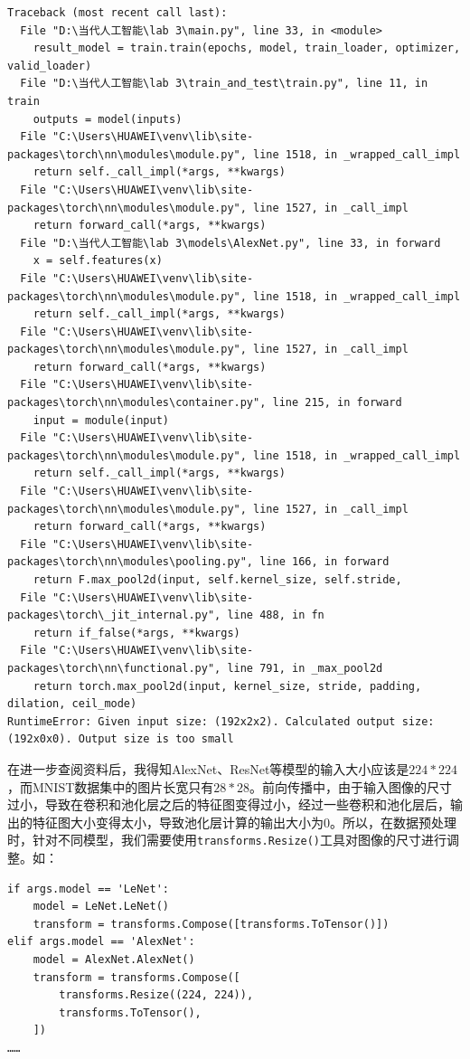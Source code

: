\documentclass{article}
\begin{document}
\begin{lstlisting}
Traceback (most recent call last):
  File "D:\当代人工智能\lab 3\main.py", line 33, in <module>
    result_model = train.train(epochs, model, train_loader, optimizer, valid_loader)
  File "D:\当代人工智能\lab 3\train_and_test\train.py", line 11, in train
    outputs = model(inputs)
  File "C:\Users\HUAWEI\venv\lib\site-packages\torch\nn\modules\module.py", line 1518, in _wrapped_call_impl
    return self._call_impl(*args, **kwargs)
  File "C:\Users\HUAWEI\venv\lib\site-packages\torch\nn\modules\module.py", line 1527, in _call_impl
    return forward_call(*args, **kwargs)
  File "D:\当代人工智能\lab 3\models\AlexNet.py", line 33, in forward
    x = self.features(x)
  File "C:\Users\HUAWEI\venv\lib\site-packages\torch\nn\modules\module.py", line 1518, in _wrapped_call_impl
    return self._call_impl(*args, **kwargs)
  File "C:\Users\HUAWEI\venv\lib\site-packages\torch\nn\modules\module.py", line 1527, in _call_impl
    return forward_call(*args, **kwargs)
  File "C:\Users\HUAWEI\venv\lib\site-packages\torch\nn\modules\container.py", line 215, in forward
    input = module(input)
  File "C:\Users\HUAWEI\venv\lib\site-packages\torch\nn\modules\module.py", line 1518, in _wrapped_call_impl
    return self._call_impl(*args, **kwargs)
  File "C:\Users\HUAWEI\venv\lib\site-packages\torch\nn\modules\module.py", line 1527, in _call_impl
    return forward_call(*args, **kwargs)
  File "C:\Users\HUAWEI\venv\lib\site-packages\torch\nn\modules\pooling.py", line 166, in forward
    return F.max_pool2d(input, self.kernel_size, self.stride,
  File "C:\Users\HUAWEI\venv\lib\site-packages\torch\_jit_internal.py", line 488, in fn
    return if_false(*args, **kwargs)
  File "C:\Users\HUAWEI\venv\lib\site-packages\torch\nn\functional.py", line 791, in _max_pool2d
    return torch.max_pool2d(input, kernel_size, stride, padding, dilation, ceil_mode)
RuntimeError: Given input size: (192x2x2). Calculated output size: (192x0x0). Output size is too small
\end{lstlisting}
在进一步查阅资料后，我得知AlexNet、ResNet等模型的输入大小应该是$224*224$，而MNIST数据集中的图片长宽只有$28*28$。前向传播中，由于输入图像的尺寸过小，导致在卷积和池化层之后的特征图变得过小，经过一些卷积和池化层后，输出的特征图大小变得太小，导致池化层计算的输出大小为$0$。所以，在数据预处理时，针对不同模型，我们需要使用\lstinline|transforms.Resize()|工具对图像的尺寸进行调整。如：
\begin{lstlisting}
if args.model == 'LeNet':
    model = LeNet.LeNet()
    transform = transforms.Compose([transforms.ToTensor()])
elif args.model == 'AlexNet':
    model = AlexNet.AlexNet()
    transform = transforms.Compose([
        transforms.Resize((224, 224)),
        transforms.ToTensor(),
    ])
……
\end{lstlisting}
\end{document}
